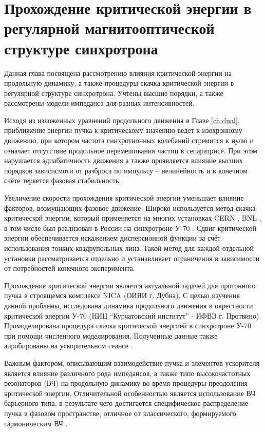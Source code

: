 
	\chapter{Прохождение критической энергии в регулярной магнитооптической структуре синхротрона}\label{ch:transition}

\par Данная глава посвящена рассмотрению влияния критической энергии на продольную динамику, а также процедуры скачка критической энергии в регулярной структуре синхротрона. Учтены высшие порядки, а также рассмотрены модели импеданса для разных интенсивностей.

\par Исходя из изложенных уравнений продольного движения в Главе \ref{ch:dual}, приближение энергии пучка к критическому значению ведет к изохронному движению, при котором частота синхротнонных колебаний стремится к нулю и означает отсутствие продольное перемешивания частиц в сепаратрисе. При этом нарушается адиабатичность движения а также проявляется влияние высших порядков зависисмоти от разброса по импульсу – нелинейность и в конечном счёте теряется фазовая стабильность.

\par Увеличение скорости прохождения критической энергии уменьшает влияние факторов, возмущающих фазовое движение. Широко используется метод скачка критической энергии, который применяется на многих установках CERN \cite{risselada:jump}, BNL \cite{ainsworth:pip}, в том числе был реализован в России на синхротроне У-70 \cite{pashkov:transition}. Сдвиг критической энергии обеспечивается искажением дисперсионной функции за счёт использования тонких квадрупольных линз. Такой метод для каждой отдельной установки рассматривается отдельно и устанавливает ограничения в зависимости от потребностей конечного эксперимента.

\par Прохождение критической энергии является актуальной задачей для протонного пучка в строящемся комплексе NICA (ОИЯИ г. Дубна). С целью изучения данной проблемы, исследована динамика продольного движения в окрестности критической энергии У-70 (НИЦ “Курчатовский институт” - ИФВЭ г. Протвино).  Промоделирована процедура скачка критической энергией в синхротроне У-70 при помощи численного моделирования. Полученные данные также апробированы на ускорительном сеансе \cite{Kolokolchikov:2025_U70}.

\par Важным фактором, описывающим взаимодействие пучка и элементов ускорителя является влияние различного рода импедансов, а также типо высокочастотных резонаторов (ВЧ) на продольную динамику во время процедуры преодоления критической энергии. Отличительной особенностью является использование ВЧ барьерного типа, в результате чего достигается специфическое распределение пучка в фазовом пространстве, отличное от классического, формируемого гармоническим ВЧ \cite{hans:bb}.


